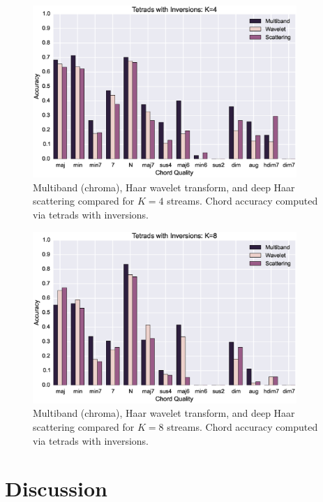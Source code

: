 \documentclass{article}
\begin{document}
\begin{figure}
 \centerline{
 \includegraphics[width=10cm]{figs/tetrad_inv4.eps}}
 \caption{Multiband (chroma), Haar wavelet transform, and deep Haar scattering compared for $K=4$ streams. Chord accuracy computed via tetrads with inversions.}
 \label{fig:tetrad4}
\end{figure}

\begin{figure}
 \centerline{
 \includegraphics[width=10cm]{figs/tetrad_inv8.eps}}
 \caption{Multiband (chroma), Haar wavelet transform, and deep Haar scattering compared for $K=8$ streams. Chord accuracy computed via tetrads with inversions.}
 \label{fig:tetrad8}
\end{figure}
	

\section{Discussion}\label{sec:discussion}
\end{document}
